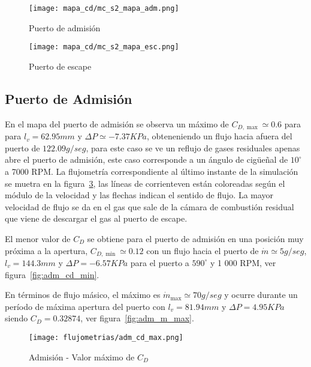 \begin{figure}[ht!]
    \centering
    \texttt{[image: mapa\_cd/mc\_s2\_mapa\_adm.png]}
    \caption{Puerto de admisión}\label{fig:mapa_cd_admision}
\end{figure}

\begin{figure}[ht!]
    \centering
    \texttt{[image: mapa\_cd/mc\_s2\_mapa\_esc.png]}
    \caption{Puerto de escape}\label{fig:mapa_cd_escape}
\end{figure}


\subsection{Puerto de Admisión}
En el mapa del puerto de admisión se observa un máximo de $C_{D,\max}\simeq 0.6$
para para $l_{v}=62.95 mm$ y $\Delta P\simeq -7.37 KPa$, obteneniendo un flujo
hacia afuera del puerto de $122.09 g/seg$, para este caso se ve un reflujo de
gases residuales apenas abre el puerto de admisión, este caso corresponde a un
ángulo de cigüeñal de $10^{\circ}$ a 7000 RPM.
%
La flujometría correspondiente al último instante de la simulación se muetra en
la figura~\ref{fig:adm_cd_max}, las líneas de corrienteven  están coloreadas
según el módulo de la velocidad y las flechas indican el sentido de flujo.
%
La mayor velocidad de flujo se da en el gas que sale de la cámara de combustión
residual que viene de descargar el gas al puerto de escape.


El menor valor de $C_{D}$ se obtiene para el puerto de admisión en una
posición muy próxima a la apertura, $C_{D,\min}\simeq 0.12$ con un flujo hacia
el puerto de $\dot{m}\simeq 5 g/seg$, $l_{v}=144.3 mm$ y $\Delta P=-6.57 KPa$ para
el puerto a $590^{\circ}$ y 1 000 RPM, ver figura~\ref{fig:adm_cd_min}.


En términos de flujo másico, el máximo es $\dot{m}_{\max}\simeq 70 g/seg$ y ocurre
durante un período de máxima apertura del puerto con $l_{v}=81.94 mm$ y
$\Delta P=4.95 KPa$ siendo $C_{D}=0.32874$, ver figura~\ref{fig:adm_m_max}.


\begin{figure}[ht!]
    \centering
    \texttt{[image: flujometrias/adm\_cd\_max.png]}
    \caption{Admisión - Valor máximo de $C_{D}$}\label{fig:adm_cd_max}
\end{figure}

